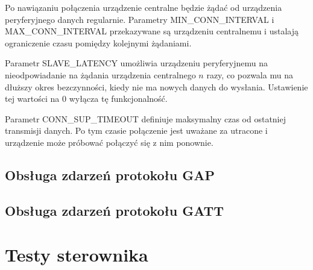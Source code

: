 Po nawiązaniu połączenia urządzenie centralne będzie żądać od urządzenia
peryferyjnego danych regularnie. Parametry MIN\_CONN\_INTERVAL
i MAX\_CONN\_INTERVAL przekazywane są urządzeniu centralnemu i ustalają
ograniczenie czasu pomiędzy kolejnymi żądaniami.

Parametr SLAVE\_LATENCY umożliwia urządzeniu peryferyjnemu na nieodpowiadanie na
żądania urządzenia centralnego $n$ razy, co pozwala mu na dłuższy okres
bezczynności, kiedy nie ma nowych danych do wysłania. Ustawienie tej wartości na
0 wyłącza tę funkcjonalność.

Parametr CONN\_SUP\_TIMEOUT definiuje maksymalny czas od ostatniej transmisji
danych. Po tym czasie połączenie jest uważane za utracone i urządzenie może
próbować połączyć się z nim ponownie.

\subsection{Obsługa zdarzeń protokołu GAP}

\subsection{Obsługa zdarzeń protokołu GATT}

\section{Testy sterownika}
